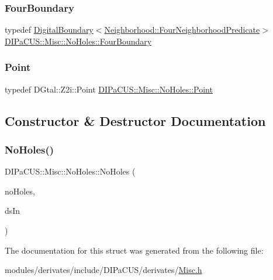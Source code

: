 \mbox{\label{structDIPaCUS_1_1Misc_1_1NoHoles_aef87b5887de2900dc0de612ad9f1d6df}} 
\subsubsection{\texorpdfstring{Four\+Boundary}{FourBoundary}}
{\footnotesize\ttfamily typedef \hyperlink{structDIPaCUS_1_1Misc_1_1DigitalBoundary}{Digital\+Boundary}$<$\hyperlink{classDIPaCUS_1_1Neighborhood_1_1FourNeighborhoodPredicate}{Neighborhood\+::\+Four\+Neighborhood\+Predicate}$>$ \hyperlink{structDIPaCUS_1_1Misc_1_1NoHoles_aef87b5887de2900dc0de612ad9f1d6df}{D\+I\+Pa\+C\+U\+S\+::\+Misc\+::\+No\+Holes\+::\+Four\+Boundary}}

\mbox{\label{structDIPaCUS_1_1Misc_1_1NoHoles_a596a57c7b9badcf299feb9649c05158b}} 
\subsubsection{\texorpdfstring{Point}{Point}}
{\footnotesize\ttfamily typedef D\+Gtal\+::\+Z2i\+::\+Point \hyperlink{structDIPaCUS_1_1Misc_1_1NoHoles_a596a57c7b9badcf299feb9649c05158b}{D\+I\+Pa\+C\+U\+S\+::\+Misc\+::\+No\+Holes\+::\+Point}}



\subsection{Constructor \& Destructor Documentation}
\mbox{\label{structDIPaCUS_1_1Misc_1_1NoHoles_ac100d4aa947d8acc9ae59739184ea488}} 
\subsubsection{\texorpdfstring{No\+Holes()}{NoHoles()}}
{\footnotesize\ttfamily D\+I\+Pa\+C\+U\+S\+::\+Misc\+::\+No\+Holes\+::\+No\+Holes (\begin{DoxyParamCaption}\item[{\hyperlink{structDIPaCUS_1_1Misc_1_1NoHoles_aea4bec251425e3c31593c97ec33a9dda}{Digital\+Set} \&}]{no\+Holes,  }\item[{const \hyperlink{structDIPaCUS_1_1Misc_1_1NoHoles_aea4bec251425e3c31593c97ec33a9dda}{Digital\+Set} \&}]{ds\+In }\end{DoxyParamCaption})}



The documentation for this struct was generated from the following file\+:\begin{DoxyCompactItemize}
\item 
modules/derivates/include/\+D\+I\+Pa\+C\+U\+S/derivates/\hyperlink{Misc_8h}{Misc.\+h}\end{DoxyCompactItemize}
